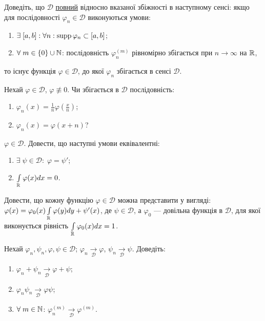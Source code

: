 \begin{exercise}
    Доведіть, що $\mathcal{D}$ \ul{повний} відносно вказаної збіжності в наступному сенсі:
    якщо для послідовності $\varphi_n \in \mathcal{D}$ виконуються умови:
    \begin{enumerate}
        \item $\exists \; [a,b]: \forall n: \operatorname{supp}\varphi_n \subset [a,b]$;
        \item $\forall \; m \in \{0\} \cup \mathbb{N}$: послідовність $\varphi_n^{(m)}$ рівномірно
        збігається при $n\to\infty$ на $\mathbb{R}$,
    \end{enumerate}
    то існує функція $\varphi \in \mathcal{D}$, до якої $\varphi_n$ збігається
    в сенсі $\mathcal{D}$.
\end{exercise}

\begin{exercise}
    Нехай $\varphi \in \mathcal{D}$, $\varphi \not\equiv 0$. Чи збігається в $\mathcal{D}$ послідовність:
    \begin{enumerate}
        \item $\varphi_n(x) = \frac{1}{n}\varphi\left(\frac{x}{n}\right)$;
        \item $\varphi_n(x) = \varphi(x+n)$?
    \end{enumerate}
\end{exercise}

\begin{exercise}
    $\varphi \in \mathcal{D}$. Довести, що наступні умови еквівалентні:
    \begin{enumerate}
        \item $\exists \; \psi \in \mathcal{D}:\; \varphi = \psi'$;
        \item $\int\limits_{\mathbb{R}} \varphi(x) dx = 0$.
    \end{enumerate}
\end{exercise}

\begin{exercise}
    Довести, що кожну функцію $\varphi \in \mathcal{D}$ можна представити у вигляді:
    $\varphi(x) = \varphi_0(x) \int\limits_{\mathbb{R}} \varphi(y) dy  + \psi'(x)$, де
    $\psi \in \mathcal{D}$, а $\varphi_0$ --- довільна функція в $\mathcal{D}$, для
    якої виконується рівність $\int\limits_{\mathbb{R}} \varphi_0(x) dx = 1$.
\end{exercise}

\begin{exercise}
    Нехай $\varphi_n, \psi_n, \varphi, \psi \in \mathcal{D}$;
    $\varphi_n \underset{\mathcal{D}}{\to} \varphi$, $\psi_n \underset{\mathcal{D}}{\to} \psi$.
    Доведіть:
    \begin{enumerate}
        \item $\varphi_n +\psi_n \underset{\mathcal{D}}{\to} \varphi +\psi$;
        \item $\varphi_n \psi_n \underset{\mathcal{D}}{\to} \varphi \psi$;
        \item $\forall \; m \in \mathbb{N}$: $\varphi_n^{(m)} \underset{\mathcal{D}}{\to} \varphi^{(m)}$.
    \end{enumerate}
\end{exercise}

